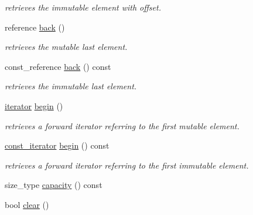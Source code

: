 \begin{DoxyCompactItemize}
\begin{DoxyCompactList}\small\item\em retrieves the immutable element with offset. \end{DoxyCompactList}\item 
\hypertarget{classhryky_1_1_fixed_vector_ae5f931bb72bde3650c40100dafc43cea}{reference \hyperlink{classhryky_1_1_fixed_vector_ae5f931bb72bde3650c40100dafc43cea}{back} ()}\label{classhryky_1_1_fixed_vector_ae5f931bb72bde3650c40100dafc43cea}

\begin{DoxyCompactList}\small\item\em retrieves the mutable last element. \end{DoxyCompactList}\item 
\hypertarget{classhryky_1_1_fixed_vector_a5b5c7152cd9d65261780fb290849a78c}{const\-\_\-reference \hyperlink{classhryky_1_1_fixed_vector_a5b5c7152cd9d65261780fb290849a78c}{back} () const }\label{classhryky_1_1_fixed_vector_a5b5c7152cd9d65261780fb290849a78c}

\begin{DoxyCompactList}\small\item\em retrieves the immutable last element. \end{DoxyCompactList}\item 
\hypertarget{classhryky_1_1_fixed_vector_ad90451d97fc185f8df9621dff03bbce8}{\hyperlink{classhryky_1_1iterator_1_1random_1_1_mutable}{iterator} \hyperlink{classhryky_1_1_fixed_vector_ad90451d97fc185f8df9621dff03bbce8}{begin} ()}\label{classhryky_1_1_fixed_vector_ad90451d97fc185f8df9621dff03bbce8}

\begin{DoxyCompactList}\small\item\em retrieves a forward iterator referring to the first mutable element. \end{DoxyCompactList}\item 
\hypertarget{classhryky_1_1_fixed_vector_a646c9c968a942f1e82cf554a085214ad}{\hyperlink{classhryky_1_1iterator_1_1random_1_1_immutable}{const\-\_\-iterator} \hyperlink{classhryky_1_1_fixed_vector_a646c9c968a942f1e82cf554a085214ad}{begin} () const }\label{classhryky_1_1_fixed_vector_a646c9c968a942f1e82cf554a085214ad}

\begin{DoxyCompactList}\small\item\em retrieves a forward iterator referring to the first immutable element. \end{DoxyCompactList}\item 
size\-\_\-type \hyperlink{classhryky_1_1_fixed_vector_a5525e3acaa5aed71b4a267804d6ba42f}{capacity} () const 
\item 
\hypertarget{classhryky_1_1_fixed_vector_a79d4720139346d618b02738557112a7a}{bool \hyperlink{classhryky_1_1_fixed_vector_a79d4720139346d618b02738557112a7a}{clear} ()}\label{classhryky_1_1_fixed_vector_a79d4720139346d618b02738557112a7a}


\end{DoxyCompactItemize}
